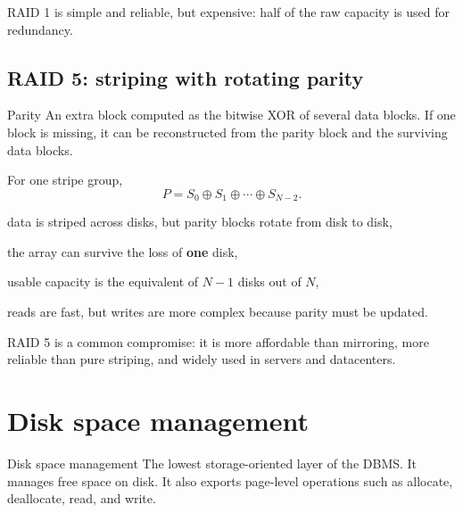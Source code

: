 \documentclass[../../dis.tex]{subfiles}
\begin{document}
RAID 1 is simple and reliable, but expensive: half of the raw capacity is used for redundancy.

\begin{schema}
{}\par}
\end{schema}

\subsection{RAID 5: striping with rotating parity}
\begin{concept}{Parity}
An extra block computed as the bitwise XOR of several data blocks. If one block is missing, it can be reconstructed from the parity block and the surviving data blocks.
\end{concept}

For one stripe group,
\[
P = S_0 \oplus S_1 \oplus \cdots \oplus S_{N-2}.
\]

\begin{dashlist}
    \item data is striped across disks, but parity blocks rotate from disk to disk,
    \item the array can survive the loss of \textbf{one} disk,
    \item usable capacity is the equivalent of \(N-1\) disks out of \(N\),
    \item reads are fast, but writes are more complex because parity must be updated.
\end{dashlist}

RAID 5 is a common compromise: it is more affordable than mirroring, more reliable than pure striping, and widely used in servers and datacenters.

\begin{schema}
{}\par}
\end{schema}

\newpage
\section{Disk space management}
\begin{concept}{Disk space management}
The lowest storage-oriented layer of the DBMS. It manages free space on disk. It also exports page-level operations such as allocate, deallocate, read, and write.
\end{concept}
\end{document}
